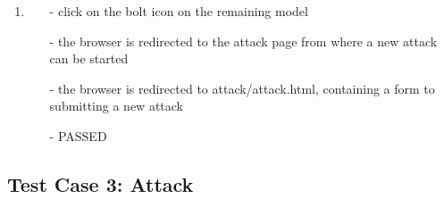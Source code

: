 \begin{description}
\begin{enumerate}
\begin{itemize}
		\end{itemize}
		\item
		\begin{itemize}
			\item [-] click on the bolt icon on the remaining model
			\item [-] the browser is redirected to the attack page from where a new attack can be started
			\item [-] the browser is redirected to attack/attack.html, containing a form to submitting a new attack
			\item [-] PASSED
		\end{itemize}
	\end{enumerate}
\end{description}

\subsection{Test Case 3: Attack}
